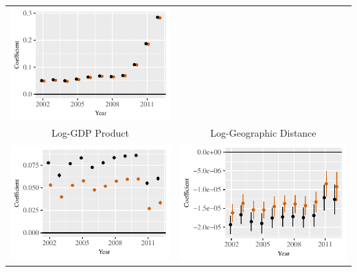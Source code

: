 \documentclass[reqno,onecolumn,letterpaper,12pt]{article}
\begin{document}
\begin{longtable}{c@{\hskip -.4cm}c}
\includegraphics[height=.2\textheight, clip=true, trim=.5cm .5cm 0cm .1cm]{draft_figures/rl_plots/LDV.pdf}   \\
Log-GDP Product &
Log-Geographic Distance\\
\includegraphics[height=.2\textheight, clip=true, trim=0cm .5cm 0cm .1cm]{draft_figures/rl_plots/GDP_Dyad.pdf}    &
\includegraphics[height=.2\textheight, clip=true, trim=.5cm .5cm 0cm .1cm]{draft_figures/rl_plots/Distance.pdf}   \\

\end{longtable}
\end{document}
